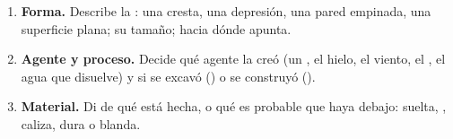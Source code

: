 \begin{method}
\begin{enumerate}
  \item \textbf{Forma.} Describe la : una cresta, una
        depresión, una pared empinada, una superficie plana; su tamaño;
        hacia dónde apunta.
  \item \textbf{Agente y proceso.} Decide qué agente la creó (un , el
        hielo, el viento, el , el agua que disuelve) y si se excavó
        () o se construyó ().
  \item \textbf{Material.} Di de qué está hecha, o qué  es probable que
        haya debajo:  suelta, , caliza,  dura o blanda.
\end{enumerate}
\end{method}

